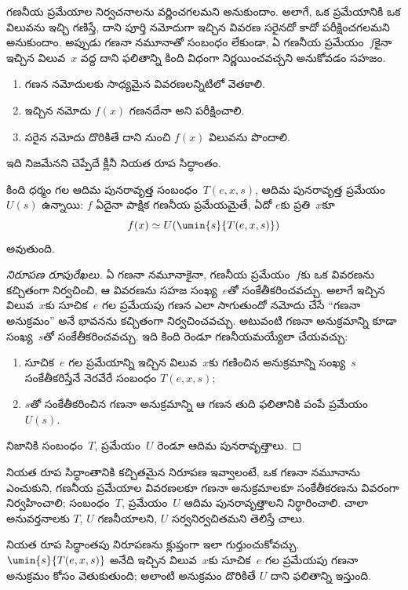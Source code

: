 \documentclass[../../../include/open-logic-section]{subfiles}
\begin{document}

గణనీయ ప్రమేయాల నిర్వచనాలను వర్ణించగలమని అనుకుందాం. అలాగే, ఒక ప్రమేయానికి
ఒక విలువను ఇచ్చి గణిస్తే, దాని పూర్తి నమోదుగా ఇచ్చిన వివరణ సరైనదో
కాదో పరీక్షించగలమని అనుకుందాం. అప్పుడు గణనా నమూనాతో సంబంధం లేకుండా,
ఏ గణనీయ ప్రమేయం~$f$కైనా ఇచ్చిన విలువ~$x$ వద్ద దాని ఫలితాన్ని కింది
విధంగా నిర్ణయించవచ్చని అనుకోవడం సహజం.
\begin{enumerate}
  \item గణన నమోదులకు సాధ్యమైన వివరణలన్నిటిలో వెతకాలి.
  \item ఇచ్చిన నమోదు $f(x)$ గణనదేనా అని పరీక్షించాలి.
  \item సరైన నమోదు దొరికితే దాని నుంచి $f(x)$ విలువను పొందాలి.
\end{enumerate}
ఇది నిజమేనని చెప్పేదే క్లీనీ నియత రూప సిద్ధాంతం.

\begin{thm}[క్లీనీ నియత రూప సిద్ధాంతం]
కింది ధర్మం గల ఆదిమ పునరావృత్త సంబంధం~$T(e,x,s)$, ఆదిమ పునరావృత్త
ప్రమేయం~$U(s)$ ఉన్నాయి: $f$ ఏదైనా పాక్షిక గణనీయ ప్రమేయమైతే, ఏదో
$e$కు ప్రతి~$x$కూ
\[
f(x) \simeq U(\umin{s}{T(e, x, s)})
\]
అవుతుంది.
\end{thm}

\begin{proof}[నిరూపణ రూపురేఖలు]
ఏ గణనా నమూనాకైనా, గణనీయ ప్రమేయం~$f$కు ఒక వివరణను కచ్చితంగా
నిర్వచించి, ఆ వివరణను సహజ సంఖ్య~$e$తో సంకేతీకరించవచ్చు. అలాగే
ఇచ్చిన విలువ~$x$కు సూచిక~$e$ గల ప్రమేయపు గణన ఎలా సాగుతుందో నమోదు చేసే
``గణనా అనుక్రమం'' అనే భావనను కచ్చితంగా నిర్వచించవచ్చు. అటువంటి గణనా
అనుక్రమాన్ని కూడా సంఖ్య~$s$తో సంకేతీకరించవచ్చు. ఇది కింది రెండూ
గణనీయమయ్యేలా చేయవచ్చు:
\begin{enumerate}
  \item సూచిక~$e$ గల ప్రమేయాన్ని ఇచ్చిన విలువ~$x$కు గణించిన అనుక్రమాన్ని
  సంఖ్య~$s$ సంకేతీకరిస్తేనే నెరవేరే సంబంధం $T(e,x,s)$;
  \item $s$తో సంకేతీకరించిన గణనా అనుక్రమాన్ని ఆ గణన తుది ఫలితానికి
  పంపే ప్రమేయం $U(s)$.
\end{enumerate}
నిజానికి సంబంధం~$T$, ప్రమేయం~$U$ రెండూ ఆదిమ పునరావృత్తాలు.
\end{proof}

\begin{explain}
నియత రూప సిద్ధాంతానికి కచ్చితమైన నిరూపణ ఇవ్వాలంటే, ఒక గణనా నమూనాను
ఎంచుకుని, గణనీయ ప్రమేయాల వివరణలకూ గణనా అనుక్రమాలకూ సంకేతీకరణను
వివరంగా నిర్వహించాలి; సంబంధం~$T$, ప్రమేయం~$U$ ఆదిమ పునరావృత్తాలని
నిర్ధారించాలి. చాలా అనువర్తనాలకు $T$, $U$ గణనీయాలని, $U$
సర్వనిర్వచితమని తెలిస్తే చాలు.

నియత రూప సిద్ధాంతపు నిరూపణను క్లుప్తంగా ఇలా గుర్తుంచుకోవచ్చు.
$\umin{s}{T(e,x,s)}$ అనేది ఇచ్చిన విలువ~$x$కు సూచిక~$e$ గల ప్రమేయపు
గణనా అనుక్రమం కోసం వెతుకుతుంది; అలాంటి అనుక్రమం దొరికితే $U$ దాని
ఫలితాన్ని ఇస్తుంది.
\end{explain}
\end{document}
